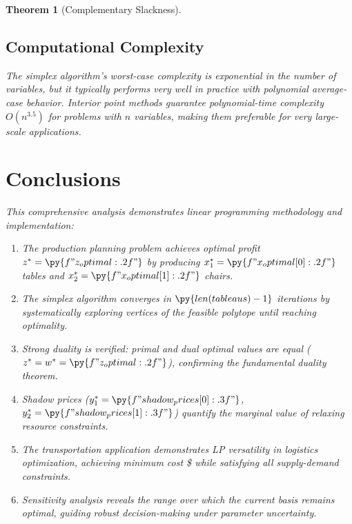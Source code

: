 \documentclass[a4paper, 11pt]{article}
\newtheorem{theorem}{Theorem}[section]
\begin{document}
\begin{theorem}[Complementary Slackness]
\subsection{Computational Complexity}

The simplex algorithm's worst-case complexity is exponential in the number of variables,
but it typically performs very well in practice with polynomial average-case behavior.
Interior point methods guarantee polynomial-time complexity $O(n^{3.5})$ for problems
with $n$ variables, making them preferable for very large-scale applications.

\section{Conclusions}

This comprehensive analysis demonstrates linear programming methodology and implementation:

\begin{enumerate}
\item The production planning problem achieves optimal profit $z^* = \py{f"{z_optimal:.2f}"}$
by producing $x_1^* = \py{f"{x_optimal[0]:.2f}"}$ tables and $x_2^* = \py{f"{x_optimal[1]:.2f}"}$ chairs.

\item The simplex algorithm converges in $\py{len(tableaus)-1}$ iterations by systematically
exploring vertices of the feasible polytope until reaching optimality.

\item Strong duality is verified: primal and dual optimal values are equal
($z^* = w^* = \py{f"{z_optimal:.2f}"}$), confirming the fundamental duality theorem.

\item Shadow prices ($y_1^* = \py{f"{shadow_prices[0]:.3f}"}$,
$y_2^* = \py{f"{shadow_prices[1]:.3f}"}$) quantify the marginal value of relaxing resource constraints.

\item The transportation application demonstrates LP versatility in logistics optimization,
achieving minimum cost \$ while satisfying all supply-demand constraints.

\item Sensitivity analysis reveals the range over which the current basis remains optimal,
guiding robust decision-making under parameter uncertainty.
\end{enumerate}


\end{theorem}
\end{document}
